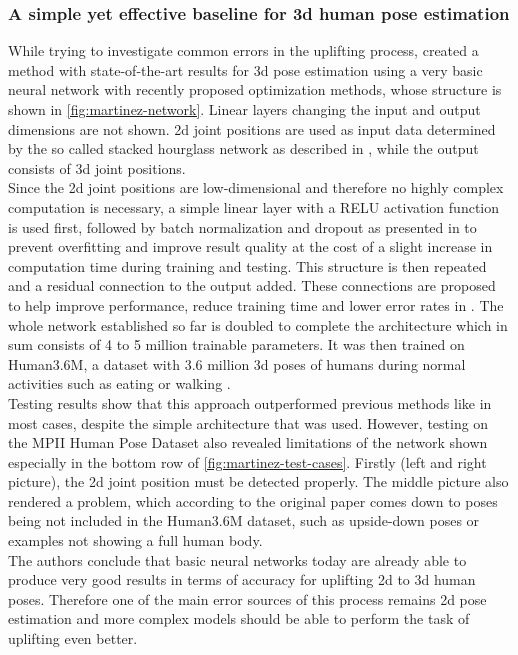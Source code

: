 \subsubsection{A simple yet effective baseline for 3d human pose estimation}
\label{sec:simple-yet-effective-baseline}
While trying to investigate common errors in the uplifting process, \cite{Martinez_2017_ICCV} created a method with state-of-the-art results for 3d pose estimation using a very basic neural network with recently proposed optimization methods, whose structure is shown in \autoref{fig:martinez-network}. Linear layers changing the input and output dimensions are not shown. 2d joint positions are used as input data determined by the so called stacked hourglass network as described in \cite{Newell2016}, while the output consists of 3d joint positions.\\
 Since the 2d joint positions are low-dimensional and therefore no highly complex computation is necessary, a simple linear layer with a RELU activation function is used first, followed by batch normalization and dropout as presented in \cite{srivastava2014} to prevent overfitting and improve result quality at the cost of a slight increase in computation time during training and testing. This structure is then repeated and a residual connection to the output added. These connections are proposed to help improve performance, reduce training time and lower error rates in \cite{HeZRS15}. The whole network established so far is doubled to complete the architecture which in sum consists of 4 to 5 million trainable parameters. It was then trained on Human3.6M, a dataset with 3.6 million 3d poses of humans during normal activities such as eating or walking \cite{H3.6M}.\\ Testing results show that this approach outperformed previous methods like \cite{PavlakosZDD16} in most cases, despite the simple architecture that was used. However, testing on the MPII Human Pose Dataset \cite{andriluka14cvpr} also revealed limitations of the network shown especially in the bottom row of \autoref{fig:martinez-test-cases}. Firstly (left and right picture), the 2d joint position must be detected properly. The middle picture also rendered a problem, which according to the original paper comes down to poses being not included in the Human3.6M dataset, such as upside-down poses or examples not showing a full human body.\\
 The authors conclude that basic neural networks today are already able to produce very good results in terms of accuracy for uplifting 2d to 3d human poses. Therefore one of the main error sources of this process remains 2d pose estimation and more complex models should be able to perform the task of uplifting even better.
 
